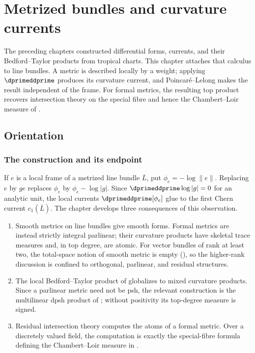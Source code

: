 \chapter{Metrized bundles and curvature currents}
\label{chap:cld-metrized-bundles}

The preceding chapters constructed differential forms, currents, and their
Bedford--Taylor products from tropical charts.  This chapter attaches that
calculus to line bundles.  A metric is described locally by a weight;
applying $\dprimeddprime$ produces its curvature current, and
Poincar\'e--Lelong makes the result independent of the frame.  For formal
metrics, the resulting top product recovers intersection theory on the
special fibre and hence the Chambert--Loir measure of
.

\section{Orientation}
\label{sec:ch17-orientation}

\subsection{The construction and its endpoint}
\label{sec:ch17-why}

If $e$ is a local frame of a metrized line bundle $\overline L$, put
$\phi_e=-\log\|e\|$.  Replacing $e$ by $ge$ replaces $\phi_e$ by
$\phi_e-\log|g|$.  Since $\dprimeddprime\log|g|=0$ for an analytic unit,
the local currents $\dprimeddprime[\phi_e]$ glue to the first Chern current
$c_1(\overline L)$.  The chapter develops three consequences of this
observation.

\begin{enumerate}
\item\label{itm:ch17-plan:classes}
 Smooth metrics on line bundles give smooth forms.  Formal metrics are
 instead strictly integral parlinear; their curvature products have
 skeletal trace measures and, in top degree, are atomic.  For vector
 bundles of rank at least two, the
 total-space notion of smooth metric is empty
 (), so the higher-rank discussion is
 confined to orthogonal, parlinear, and residual structures.
\item\label{itm:ch17-plan:products}
 The local Bedford--Taylor product of 
 globalizes to mixed curvature products.  Since a parlinear metric need not
 be psh, the relevant construction is the multilinear dpsh product of
 ; without positivity its top-degree measure is
 signed.
\item\label{itm:ch17-plan:numbers}
 Residual intersection theory computes the atoms of a formal metric.  Over
 a discretely valued field, the computation is exactly the special-fibre
 formula defining the Chambert--Loir measure in .
\end{enumerate}

